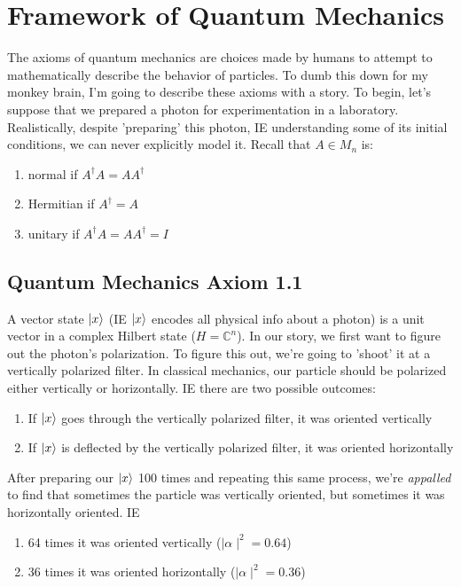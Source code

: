 \documentclass[12pt]{article}
\theoremstyle{plain}
\theoremstyle{nonumberplain}
\theoremstyle{plain}
\theoremstyle{nonumberplain}
\newcommand\1{{\bf 1}}
\newcommand{\C}{\mathbb{C}} %
\newcommand{\<}{\left\langle}
\renewcommand{\>}{\right\rangle}
\begin{document}

\section{Framework of Quantum Mechanics}

The axioms of quantum mechanics are choices made by humans to attempt to mathematically describe the behavior of particles. To dumb this down for my monkey brain, I'm going to describe these axioms with a story. To begin, let's suppose that we prepared a photon for experimentation in a laboratory. Realistically, despite 'preparing' this photon, IE understanding some of its initial conditions, we can never explicitly model it. Recall that $A\in M_n$ is:
\begin{enumerate}
\item normal if $A^\dagger A=AA^\dagger$
\item Hermitian if $A^\dagger=A$
\item unitary if $A^\dagger A=AA^\dagger=I$
\end{enumerate}


\subsection{Quantum Mechanics Axiom 1.1}
\label{section:qma11}
A vector state $\ket{x}$ (IE $\ket{x}$ encodes all physical info about a photon) is a unit vector in a complex Hilbert state ($H=\C^n$). In our story, we first want to figure out the photon's polarization. To figure this out, we're going to 'shoot' it at a vertically polarized filter. In classical mechanics, our particle should be polarized either vertically or horizontally. IE there are two possible outcomes:
\begin{enumerate}
\item If $\ket{x}$ goes through the vertically polarized filter, it was oriented vertically
\item If $\ket{x}$ is deflected by the vertically polarized filter, it was oriented horizontally
\end{enumerate}
After preparing our $\ket{x}$ 100 times and repeating this same process, we're \textit{appalled} to find that sometimes the particle was vertically oriented, but sometimes it was horizontally oriented. IE
\begin{enumerate}
\item 64 times it was oriented vertically ($\mid\alpha\mid^2=0.64$)
\item 36 times it was oriented horizontally ($\mid\alpha\mid^2=0.36$)
\end{enumerate}
\end{document}
